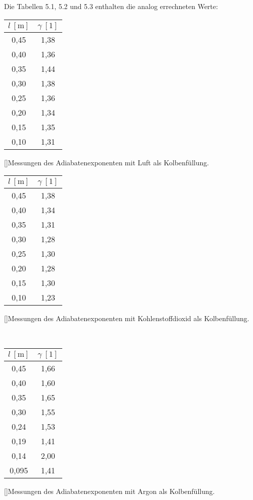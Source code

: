          
         Die Tabellen 5.1, 5.2 und 5.3 enthalten die analog errechneten Werte:
         \begin{center}
         
         \begin{tabular}{c|c}
$l ~ [\text{m}]$ & $\gamma ~ [1]$    \\ \hline
0,45 & 1,38 \\
0,40 & 1,36 \\
0,35 & 1,44 \\
0,30 & 1,38 \\
0,25 & 1,36 \\
0,20 & 1,34 \\
0,15 & 1,35 \\
0,10 & 1,31 
\end{tabular}
[]{Messungen des Adiabatenexponenten mit Luft als Kolbenfüllung.}
\end{center}
\begin{minipage}{\textwidth}
\begin{center}
         \begin{tabular}{c|c}
$l ~ [\text{m}]$ & $\gamma ~ [1]$    \\ \hline
 0,45	& 1,38 \\
 0,40	& 1,34 \\
 0,35	& 1,31 \\
 0,30	& 1,28 \\
 0,25	& 1,30 \\
 0,20	& 1,28 \\
 0,15	& 1,30 \\ 
 0,10	& 1,23
\end{tabular}
[]{Messungen des Adiabatenexponenten mit Kohlenstoffdioxid als Kolbenfüllung.}         
\end{center}
\end{minipage}
\begin{center}
\ \\         
\begin{tabular}{c|c}
$l ~ [\text{m}]$ & $\gamma ~ [1]$    \\ \hline
0,45   & 1,66 \\
0,40    & 1,60 \\
0,35   & 1,65 \\
0,30    & 1,55 \\
0,24   & 1,53 \\
0,19   & 1,41 \\
0,14   & 2,00 \\
0,095  & 1,41 
\end{tabular}
[]{Messungen des Adiabatenexponenten mit Argon als Kolbenfüllung.}
\end{center}
\ \\
